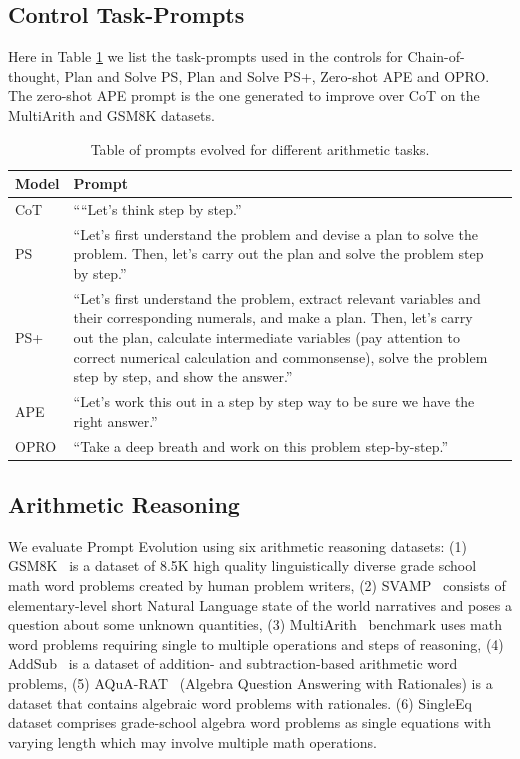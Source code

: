 \documentclass{article} %
\begin{document}
\subsection{Control Task-Prompts}
\label{appendix:control_prompts}

Here in Table \ref{tab:prompt_table2} we list the task-prompts used in the controls for Chain-of-thought, Plan and Solve PS, Plan and Solve PS+, Zero-shot APE and OPRO. The zero-shot APE prompt is the one generated to improve over CoT on the MultiArith and GSM8K datasets.

\begin{table}[h!]
\centering
\begin{tabularx}{\textwidth}{lXX}
\toprule
\textbf{Model} & \textbf{Prompt} \\ 
\midrule
CoT & ``“Let’s think step by step.''\\ 
PS &  ``Let’s first understand the problem and devise a plan to solve the problem. Then, let’s carry out the plan and solve the problem step by step.''\\ 
PS+ & ``Let’s first understand the problem, extract relevant variables and their corresponding numerals, and make a plan. Then, let’s carry out the plan, calculate intermediate variables (pay attention to correct numerical calculation and commonsense), solve the problem step by step, and show the answer.''\\ 
APE &  ``Let’s work this out in a step by step way to be sure we have the right answer.''\\ 
OPRO & ``Take a deep breath and work on this problem step-by-step.''\\ 
\bottomrule
\end{tabularx}
\caption{Table of prompts evolved for different arithmetic tasks.}
\label{tab:prompt_table2}
\end{table}


\subsection{Arithmetic Reasoning}

We evaluate Prompt Evolution using six arithmetic reasoning datasets: 
(1) GSM8K~\citep{DBLP:journals/corr/abs-2110-14168} is a dataset of 8.5K high quality linguistically diverse grade school math word problems created by human problem writers,
(2) SVAMP~\citep{DBLP:conf/naacl/PatelBG21} consists of elementary-level short Natural Language state of the world narratives and poses a question about some unknown quantities,
(3) MultiArith~\citep{roy2016solving} benchmark uses math word problems requiring single to multiple operations and steps of reasoning,
(4) AddSub~\citep{hosseini-etal-2014-learning} is a dataset of addition- and subtraction-based arithmetic word problems,
(5) AQuA-RAT~\citep{ling-etal-2017-program} (Algebra Question Answering with Rationales) is a dataset that contains algebraic word problems with rationales.
(6) SingleEq~\citep{koncel-kedziorski-etal-2015-parsing} dataset comprises grade-school algebra word problems as single equations with varying length which may involve multiple math operations. 
\end{document}
